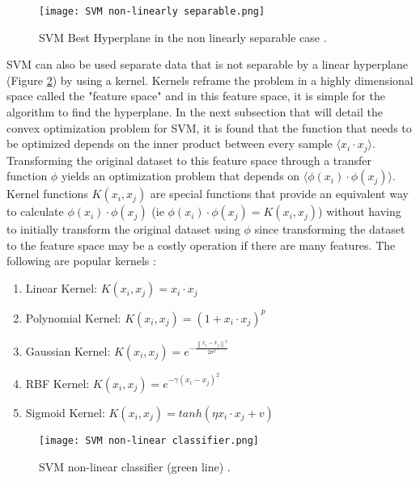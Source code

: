 \begin{figure}[ht]
    \centering
    \texttt{[image: SVM non-linearly separable.png]}
    \caption{SVM Best Hyperplane in the non linearly separable case \cite{cervantesComprehensiveSurveySupport2020}.}
    \label{fig:svm-hyperplane-non-linearly-separable}
\end{figure}

SVM can also be used separate data that is not separable by a linear hyperplane (Figure \ref{fig:svm-hyperplane-non-linearly-classifier}) by using a kernel. Kernels reframe the problem in a highly dimensional space called the "feature space" and in this feature space, it is simple for the algorithm to find the hyperplane. In the next subsection that will detail the convex optimization problem for SVM, it is found that the function that needs to be optimized depends on the inner product between every sample $\langle x_i \cdot x_j \rangle$. Transforming the original dataset to this feature space through a transfer function $\phi$ yields an optimization problem that depends on $\langle \phi(x_i) \cdot \phi(x_j) \rangle$. Kernel functions $K(x_i, x_j)$ are special functions that provide an equivalent way to calculate $\phi(x_i) \cdot \phi(x_j)$ (ie $\phi(x_i) \cdot \phi(x_j) = K(x_i, x_j)$) without having to initially transform the original dataset using $\phi$ since transforming the dataset to the feature space may be a costly operation if there are many features. The following are popular kernels \cite{cervantesComprehensiveSurveySupport2020}:

\begin{enumerate}
    \item Linear Kernel: $K(x_i, x_j) = x_i \cdot x_j$
    \item Polynomial Kernel: $K(x_i, x_j) = (1 + x_i \cdot x_j)^p$
    \item Gaussian Kernel: $K(x_i, x_j) = e^{-\frac{{\left\lVert x_i - x_j\right\rVert}^2}{2\sigma^2}}$
    \item RBF Kernel: $K(x_i, x_j) = e^{-\gamma(x_i - x_j)^2}$
    \item Sigmoid Kernel: $K(x_i, x_j) = tanh(\eta x_i \cdot x_j + v )$
\end{enumerate}

\begin{figure}[ht]
    \centering
    \texttt{[image: SVM non-linear classifier.png]}
    \caption{SVM non-linear classifier (green line) \cite{cervantesComprehensiveSurveySupport2020}.}
    \label{fig:svm-hyperplane-non-linearly-classifier}
\end{figure}

